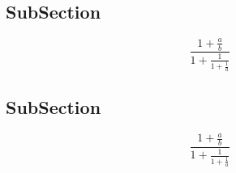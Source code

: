 \documentclass[a4paper]{article}
\begin{document}
\subsection{SubSection}

\[ \frac{1+\frac{a}{b}}{1+\frac{1}{1+\frac{1}{a}}} \]

\subsection{SubSection}

\[ \frac{1+\frac{a}{b}}{1+\frac{1}{1+\frac{1}{a}}} \]
\end{document}
